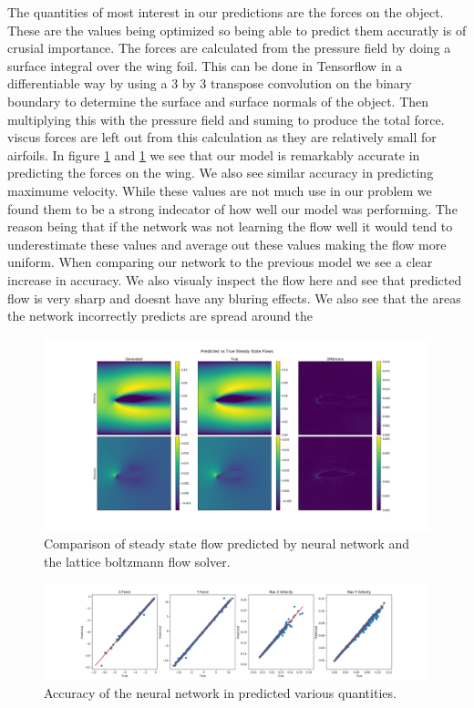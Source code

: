 \documentclass{article} %
\begin{document}
The quantities of most interest in our predictions are the forces on the object. These are the values being optimized so being able to predict them accuratly is of crusial importance. The forces are calculated from the pressure field by doing a surface integral over the wing foil. This can be done in Tensorflow in a differentiable way by using a 3 by 3 transpose convolution on the binary boundary to determine the surface and surface normals of the object. Then multiplying this with the pressure field and suming to produce the total force. viscus forces are left out from this calculation as they are relatively small for airfoils. In figure \ref{flow_accuracy} and \ref{flow_accuracy} we see that our model is remarkably accurate in predicting the forces on the wing. We also see similar accuracy in predicting maximume velocity. While these values are not much use in our problem we found them to be a strong indecator of how well our model was performing. The reason being that if the network was not learning the flow well it would tend to underestimate these values and average out these values making the flow more uniform. When comparing our network to the previous model we see a clear increase in accuracy. We also visualy inspect the flow here and see that predicted flow is very sharp and doesnt have any bluring effects. We also see that the areas the network incorrectly predicts are spread around the 

\begin{figure}[!t]
\begin{center}
\includegraphics[scale=0.30]{../test/figs/generated_flow_difference.jpeg}
\end{center}
\caption{Comparison of steady state flow predicted by neural network and the lattice boltzmann flow solver.}
\label{flow_accuracy}
\end{figure}

\begin{figure}[h]
\begin{center}
\includegraphics[scale=0.30]{../test/figs/flow_accuracy_2d.jpeg}
\end{center}
\caption{Accuracy of the neural network in predicted various quantities.}
\end{figure}
\end{document}
